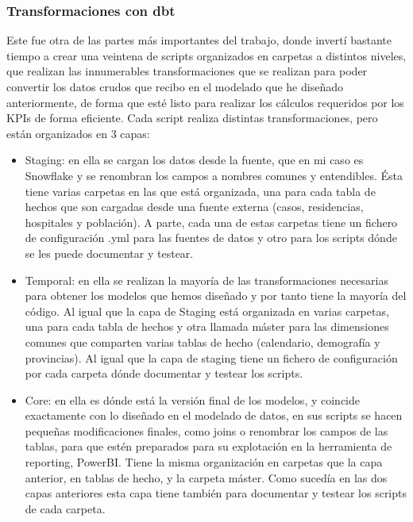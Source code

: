 \subsubsection{Transformaciones con dbt}

Este fue otra de las partes más importantes del trabajo, donde invertí bastante tiempo a crear una veintena de scripts organizados en carpetas a distintos niveles, que realizan las innumerables transformaciones que se realizan para poder convertir los datos crudos que recibo en el modelado que he diseñado anteriormente, de forma que esté listo para realizar los cálculos requeridos por los KPIs de forma eficiente. Cada script realiza distintas transformaciones, pero están organizados en 3 capas:


\begin{itemize}\tightlist
    \item Staging: en ella se cargan los datos desde la fuente, que en mi caso es Snowflake y se renombran los campos a nombres comunes y entendibles. Ésta tiene varias carpetas en las que está organizada, una para cada tabla de hechos que son cargadas desde una fuente externa (casos, residencias, hospitales y población). 
    A parte, cada una de estas carpetas tiene un fichero de configuración .yml para las fuentes de datos y otro para los scripts dónde se les puede documentar y testear.
    
    \item Temporal: en ella se realizan la mayoría de las transformaciones necesarias para obtener los modelos que hemos diseñado y por tanto tiene la mayoría del código. Al igual que la capa de Staging está organizada en varias carpetas, una para cada tabla de hechos y otra llamada máster para las dimensiones comunes que comparten varias tablas de hecho (calendario, demografía y provincias).
    Al igual que la capa de staging tiene un fichero de configuración por cada carpeta dónde documentar y testear los scripts.
    
    \item Core: en ella es dónde está la versión final de los modelos, y coincide exactamente con lo diseñado en el modelado de datos, en sus scripts se hacen pequeñas modificaciones finales, como joins o renombrar los campos de las tablas, para que estén preparados para su explotación en la herramienta de reporting, PowerBI. Tiene la misma organización en carpetas que la capa anterior, en tablas de hecho, y la carpeta máster.
    Como sucedía en las dos capas anteriores esta capa tiene también para documentar y testear los scripts de cada carpeta.
    
\end{itemize}

